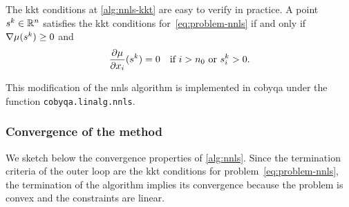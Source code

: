 The \gls{kkt} conditions at \cref{alg:nnls-kkt} are easy to verify in practice.
A point~$\sstep[k] \in \R^n$ satisfies the \gls{kkt} conditions for~\cref{eq:problem-nnls} if and only if~$\nabla \mu(\sstep[k]) \ge 0$ and
\begin{equation*}
    \frac{\partial \mu}{\partial \iter_i} (\sstep[k]) = 0 \quad \text{if~$i > n_0$ or~$\sstep[k]_i > 0$.}
\end{equation*}

This modification of the \gls{nnls} algorithm is implemented in \gls{cobyqa} under the function \texttt{cobyqa.linalg.nnls}.

\subsubsection{Convergence of the method}

We sketch below the convergence properties of \cref{alg:nnls}.
Since the termination criteria of the outer loop are the \gls{kkt} conditions for problem~\cref{eq:problem-nnls}, the termination of the algorithm implies its convergence because the problem is convex and the constraints are linear.



